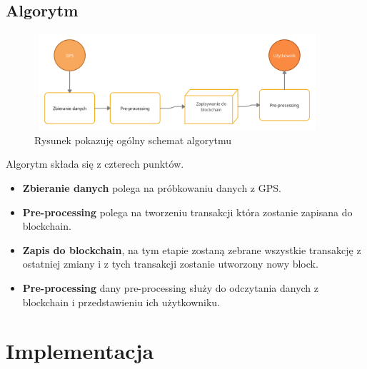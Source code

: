 \documentclass{sprawozdanie-agh}
\begin{document}
\subsection{Algorytm}
\begin{figure}[htbp]
    \centerline{\includegraphics[width=400px,height=135px]{algo_blockchain.png}}
    \caption{Rysunek pokazuję ogólny schemat algorytmu}
    \label{fig}
\end{figure}
Algorytm składa się z czterech punktów.

\begin{itemize}
  \item \textbf{Zbieranie danych} polega na próbkowaniu danych z GPS.
  \item \textbf{Pre-processing} polega na tworzeniu transakcji która zostanie zapisana do blockchain.
  \item \textbf{Zapis do blockchain}, na tym etapie zostaną zebrane wszystkie transakcję z ostatniej zmiany i z tych transakcji zostanie utworzony nowy block. 
  \item \textbf{Pre-processing} dany pre-processing służy do odczytania danych z blockchain i przedstawieniu ich użytkowniku.
\end{itemize}

\section{Implementacja}
\end{document}

